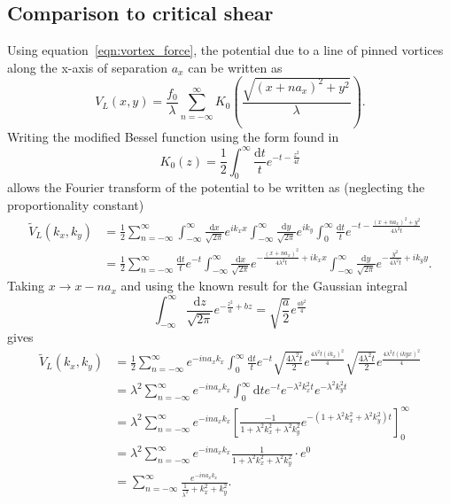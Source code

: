 \documentclass{article}
\numberwithin{equation}{section}
\begin{document}
\subsection{Comparison to critical shear}
Using equation~\ref{eqn:vortex_force}, the potential due to a line of pinned vortices along the x-axis of separation $a_x$ can be written as \cite{Watkins2016DensitySuperconductors}
\begin{equation}
    V_L(x, y) = \frac{f_0}{\lambda}\sum_{n=-\infty}^\infty K_0 \left( \frac{\sqrt{(x + na_x)^2 + y^2}}{\lambda} \right).
\end{equation}
Writing the modified Bessel function using the form found in \cite{I.S.Gradshteyn2015TableProducts}
\begin{equation}
    K_0(z) = \frac{1}{2}\int_0^\infty \frac{\mathrm{d}t}{t}e^{-t-\frac{z^2}{4t}}
\end{equation}
allows the Fourier transform of the potential to be written as (neglecting the proportionality constant)
\begin{align*}
    \tilde{V}_L(k_x, k_y) &= \frac{1}{2}\sum_{n=-\infty}^\infty \int_{-\infty}^\infty\frac{\mathrm{d}x}{\sqrt{2\pi}}e^{ik_xx} \int_{-\infty}^\infty\frac{\mathrm{d}y}{\sqrt{2\pi}}e^{ik_y} \int_0^\infty\frac{\mathrm{d}t}{t}e^{-t-\frac{(x+na_x)^2 + y^2}{4\lambda^2t}} \\
    &= \frac{1}{2}\sum_{n=-\infty}^\infty \frac{\mathrm{d}t}{t}e^{-t} \int_{-\infty}^\infty\frac{\mathrm{d}x}{\sqrt{2\pi}}e^{-\frac{(x+na_x)^2}{4\lambda^2t}+ik_xx}
    \int_{-\infty}^\infty\frac{\mathrm{d}y}{\sqrt{2\pi}}e^{-\frac{y^2}{4\lambda^2t}+ik_yy}.
\end{align*}
Taking $x \rightarrow x - na_x$ and using the known result for the Gaussian integral
\begin{equation}
    \int_{-\infty}^\infty\frac{\mathrm{d}z}{\sqrt{2\pi}}e^{-\frac{z^2}{a}+bz} = \sqrt{\frac{a}{2}}e^{\frac{ab^2}{4}}
\end{equation}
gives
\begin{align*}
    \tilde{V}_L(k_x, k_y) &= \frac{1}{2}\sum_{n=-\infty}^\infty e^{-ina_xk_x} \int_0^\infty\frac{\mathrm{d}t}{t}e^{-t} \sqrt{\frac{4\lambda^2t}{2}}e^{\frac{4\lambda^2t(ik_x)^2}{4}} \sqrt{\frac{4\lambda^2t}{2}}e^{\frac{4\lambda^2t(ikyx)^2}{4}} \\
    &= \lambda^2\sum_{n=-\infty}^\infty e^{-ina_xk_x} \int_0^\infty\mathrm{d}te^{-t}e^{-\lambda^2k_x^2t}e^{-\lambda^2k_y^2t} \\
    &= \lambda^2\sum_{n=-\infty}^\infty e^{-ina_xk_x} \left[\frac{-1}{1+\lambda^2k_x^2+\lambda^2k_y^2} e^{-\left(1+\lambda^2k_x^2+\lambda^2k_y^2\right)t}\right]_0^\infty\ \\
    &= \lambda^2\sum_{n=-\infty}^\infty e^{-ina_xk_x} \frac{1}{1+\lambda^2k_x^2+\lambda^2k_y^2} \cdot e^0 \\
    &= \sum_{n=-\infty}^\infty \frac{e^{-ina_xk_x}}{\frac{1}{\lambda^2}+k_x^2+k_y^2}.
\end{align*}
\end{document}
